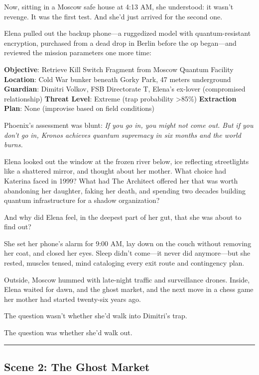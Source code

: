 Now, sitting in a Moscow safe house at 4:13 AM, she understood: it wasn't revenge. It was the first test. And she'd just arrived for the second one.

Elena pulled out the backup phone---a ruggedized model with quantum-resistant encryption, purchased from a dead drop in Berlin before the op began---and reviewed the mission parameters one more time:

\textbf{Objective}: Retrieve Kill Switch Fragment from Moscow Quantum Facility \textbf{Location}: Cold War bunker beneath Gorky Park, 47 meters underground \textbf{Guardian}: Dimitri Volkov, FSB Directorate T, Elena's ex-lover (compromised relationship) \textbf{Threat Level}: Extreme (trap probability \textgreater85\%) \textbf{Extraction Plan}: None (improvise based on field conditions)

Phoenix's assessment was blunt: \emph{If you go in, you might not come out. But if you don't go in, Kronos achieves quantum supremacy in six months and the world burns.}

Elena looked out the window at the frozen river below, ice reflecting streetlights like a shattered mirror, and thought about her mother. What choice had Katerina faced in 1999? What had The Architect offered her that was worth abandoning her daughter, faking her death, and spending two decades building quantum infrastructure for a shadow organization?

And why did Elena feel, in the deepest part of her gut, that she was about to find out?

She set her phone's alarm for 9:00 AM, lay down on the couch without removing her coat, and closed her eyes. Sleep didn't come---it never did anymore---but she rested, muscles tensed, mind cataloging every exit route and contingency plan.

Outside, Moscow hummed with late-night traffic and surveillance drones. Inside, Elena waited for dawn, and the ghost market, and the next move in a chess game her mother had started twenty-six years ago.

The question wasn't whether she'd walk into Dimitri's trap.

The question was whether she'd walk out.

\begin{center}\rule{0.5\linewidth}{0.5pt}\end{center}

\hypertarget{scene-2-the-ghost-market}{%
\subsection{Scene 2: The Ghost Market}\label{scene-2-the-ghost-market}}

